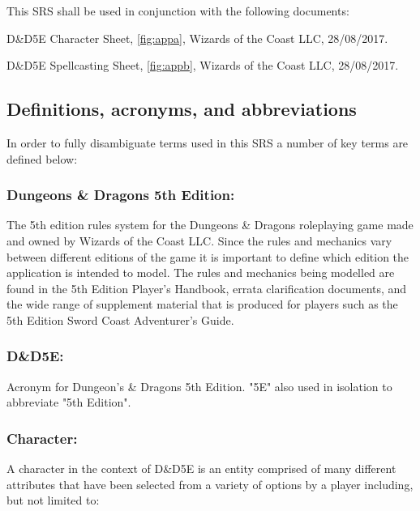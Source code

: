 \documentclass{article}
\begin{document}


This SRS shall be used in conjunction with the following documents:

D\&D5E Character Sheet, \ref{fig:appa}, Wizards of the Coast LLC, 28/08/2017.

D\&D5E Spellcasting Sheet, \ref{fig:appb}, Wizards of the Coast LLC, 28/08/2017.


\subsection{Definitions, acronyms, and abbreviations}

In order to fully disambiguate terms used in this SRS a number of key terms are defined below:

\subsubsection{Dungeons \& Dragons 5th Edition:}
The 5th edition rules system for the Dungeons \& Dragons roleplaying game made and owned by Wizards of the Coast LLC. Since the rules and mechanics vary between different editions of the game it is important to define which edition the application is intended to model. The rules and mechanics being modelled are found in the 5th Edition Player's Handbook, errata clarification documents, and the wide range of supplement material that is produced for players such as the 5th Edition Sword Coast Adventurer's Guide.

\subsubsection{D\&D5E:}
Acronym for Dungeon's \& Dragons 5th Edition. "5E" also used in isolation to abbreviate "5th Edition".


\subsubsection{Character:}
A character in the context of D\&D5E is an entity comprised of many different attributes that have been selected from a variety of options by a player including, but not limited to:
\end{document}
